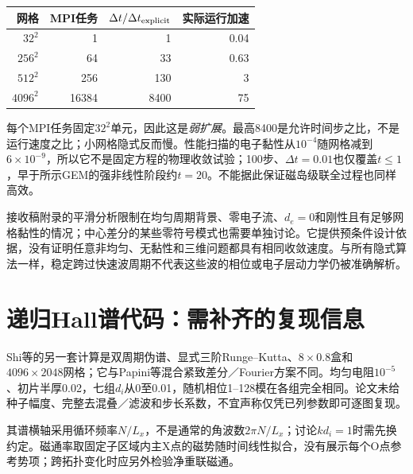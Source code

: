 \begin{center}\small
\begin{tabular}{rrrr}\toprule
网格 & MPI任务 & $\Delta t/\Delta t_{\rm explicit}$ & 实际运行加速\\\midrule
$32^2$ &1&1&0.04\\
$256^2$&64&33&0.63\\
$512^2$&256&130&3\\
$4096^2$&16384&8400&75\\\bottomrule
\end{tabular}\end{center}
每个MPI任务固定$32^2$单元，因此这是\emph{弱扩展}。最高8400是允许时间步之比，不是运行速度之比；小网格隐式反而慢。性能扫描的电子黏性从$10^{-4}$随网格减到$6\times10^{-9}$，所以它不是固定方程的物理收敛试验；100步、$\Delta t=0.01$也仅覆盖$t\leq1$，早于所示GEM的强非线性阶段约$t=20$。不能据此保证磁岛级联全过程也同样高效。

接收稿附录的平滑分析限制在均匀周期背景、零电子流、$d_e=0$和刚性且有足够网格黏性的情况；中心差分的某些零符号模式也需要单独讨论。它提供预条件设计依据，没有证明任意非均匀、无黏性和三维问题都具有相同收敛速度。与所有隐式算法一样，稳定跨过快速波周期不代表这些波的相位或电子层动力学仍被准确解析。

\section{递归Hall谱代码：需补齐的复现信息}
Shi等的另一套计算是双周期伪谱、显式三阶Runge--Kutta、$8\times0.8$盒和$4096\times2048$网格；它与Papini等混合紧致差分／Fourier方案不同。均匀电阻$10^{-5}$、初片半厚0.02，七组$d_i$从0至0.01，随机相位1--128模在各组完全相同。论文未给种子幅度、完整去混叠／滤波和步长系数，不宜声称仅凭已列参数即可逐图复现。

其谱横轴采用循环频率$N/L_x$，不是通常的角波数$2\pi N/L_x$；讨论$kd_i=1$时需先换约定。磁通率取固定子区域内主X点的磁势随时间线性拟合，没有展示每个O点参考势项；跨拓扑变化时应另外检验净重联磁通。\citep{L263}




